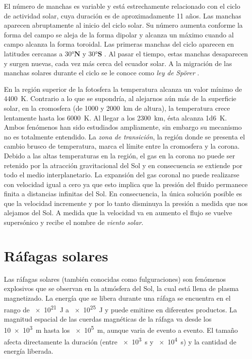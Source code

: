 El número de manchas es variable y está estrechamente relacionado con el ciclo de actividad solar, cuya duración es de aproximadamente \num{11} años. Las manchas aparecen abruptamente al inicio del ciclo solar. Su número aumenta conforme la forma del campo se aleja de la forma dipolar y alcanza un máximo cuando al campo alcanza la forma toroidal. Las primeras manchas del ciclo aparecen en latitudes cercanas a  $\ang{30}\mathbf{N}$ y $\ang{30}\mathbf{S}$ \cite{golub14}. Al pasar el tiempo, estas manchas desaparecen y surgen nuevas, cada vez más cerca del ecuador solar. A la migración de las manchas solares durante el ciclo se le conoce como \emph{ley de Spörer} \cite{noyes82}.

En la región superior de la fotosfera la temperatura alcanza un valor mínimo de \SI{4400}{\kelvin}. Contrario a lo que se supondría, al alejarnos aún más de la superficie solar, en la cromosfera (de \num{1000} y \SI{2000}{\kilo\metre} de altura), la temperatura crece lentamente hasta los \SI{6000}{\kelvin}. Al llegar a los \SI{2300}{\kilo\metre}, ésta alcanza \SI{1d6}{\kelvin}. Ambos fenómenos han sido estudiados ampliamente, sin embargo su mecanismo no es totalmente entendido. La \emph{zona de transición}, la región donde se presenta el cambio brusco de temperatura, marca el límite entre la cromosfera y la corona. Debido a las altas temperaturas en la región, el gas en la corona no puede ser retenido por la atracción gravitacional del Sol y en consecuencia se extiende por todo el medio interplanetario. La expansión del gas coronal no puede realizarse con velocidad igual a cero ya que esto implica que la presión del fluido permanece finita a distancias infinitas del Sol. En consecuencia, la única solución posible es que la velocidad incremente y por lo tanto disminuya la presión a medida que nos alejamos del Sol. A medida que la velocidad va en aumento el flujo se vuelve supersónico y recibe el nombre de \emph{viento solar}.

\section{Ráfagas solares}

Las ráfagas solares (también conocidas como fulguraciones) son fenómenos explosivos que se observan en la atmósfera del Sol, la cual está llena de plasma magnetizado. La energía que se libera durante una ráfaga se encuentra en el rango de \SI{e21}{\joule} a \SI{e25}{\joule} y puede emitirse en diferentes productos. La magnitud espacial de las cuerdas magnéticas de la ráfaga va desde los \SI{10e3}{\metre} hasta los \SI{e5}{\metre}, aunque varia de evento a evento. El tamaño afecta directamente la duración (entre \SI{e3}{\second} y \SI{e4}{\second}) y la cantidad de energía liberada.

